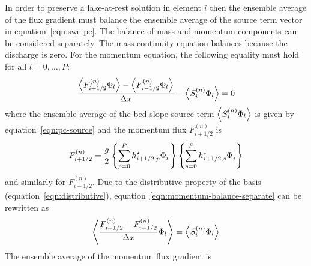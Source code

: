 In order to preserve a lake-at-rest solution in element $i$ then the ensemble average of the flux gradient must balance the ensemble average of the source term vector in equation~\eqref{eqn:swe-pc}.
The balance of mass and momentum components can be considered separately.
The mass continuity equation balances because the discharge is zero.
For the momentum equation, the following equality must hold for all $l = 0, \ldots, P$:
\begin{align}
\frac{\left\langle F_{i+1/2}^{(n)} \Phi_l \right\rangle - \left\langle F_{i-1/2}^{(n)} \Phi_l \right\rangle}{\Delta x}
-
\left\langle S_i^{(n)} \Phi_l \right\rangle
= 0
\label{eqn:momentum-balance-separate}
\end{align}
where the ensemble average of the bed slope source term $\left\langle S_i^{(n)} \Phi_l \right\rangle$ is given by equation~\eqref{eqn:pc-source} and the momentum flux $F_{i+1/2}^{(n)}$ is
\begin{align}
F_{i+1/2}^{(n)} = \frac{g}{2}
\left\{\sum_{p=0}^P h^\star_{i+1/2,p} \Phi_p\right\}
\left\{\sum_{s=0}^P h^\star_{i+1/2,s} \Phi_s\right\}
\end{align}
and similarly for $F_{i-1/2}^{(n)}$.
Due to the distributive property of the basis (equation~\ref{eqn:distributive}), equation~\eqref{eqn:momentum-balance-separate} can be rewritten as
\begin{align}
\left\langle \frac{F_{i+1/2}^{(n)} 
-
F_{i-1/2}^{(n)}}{\Delta x} \Phi_l \right\rangle
=
\left\langle  S_i^{(n)} \Phi_l \right\rangle
\label{eqn:momentum-balance}
\end{align}
The ensemble average of the momentum flux gradient is
